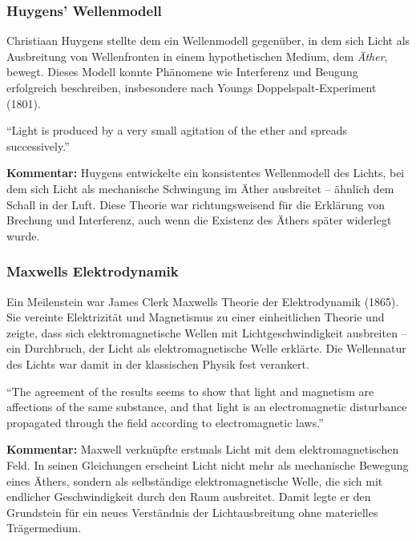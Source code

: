 \subsubsection{Huygens’ Wellenmodell}
Christiaan Huygens stellte dem ein Wellenmodell gegenüber, in dem sich Licht als Ausbreitung von Wellenfronten in einem hypothetischen Medium, dem \emph{Äther}, bewegt. Dieses Modell konnte Phänomene wie Interferenz und Beugung erfolgreich beschreiben, insbesondere nach Youngs Doppelspalt-Experiment (1801).
\vspace{1em}
\begin{tcolorbox}[physikbox, title={Huygens (1960) über Lichtausbreitung \cite{huygens_light}}]
	\label{box:huygens}
	“Light is produced by a very small agitation of the ether and spreads successively.”\\
	
	
	\vspace{1em}
	
	\textbf{Kommentar:} Huygens entwickelte ein konsistentes Wellenmodell des Lichts, bei dem sich Licht als mechanische Schwingung im Äther ausbreitet – ähnlich dem Schall in der Luft. Diese Theorie war richtungsweisend für die Erklärung von Brechung und Interferenz, auch wenn die Existenz des Äthers später widerlegt wurde.
\end{tcolorbox}
\vspace{1em}
\newpage
\noindent
\subsubsection{Maxwells Elektrodynamik}
Ein Meilenstein war James Clerk Maxwells Theorie der Elektrodynamik (1865). Sie vereinte Elektrizität und Magnetismus zu einer einheitlichen Theorie und zeigte, dass sich elektromagnetische Wellen mit Lichtgeschwindigkeit ausbreiten – ein Durchbruch, der Licht als elektromagnetische Welle erklärte. Die Wellennatur des Lichts war damit in der klassischen Physik fest verankert.
	\vspace{1em}
\begin{tcolorbox}[physikbox,title={Maxwell (1873)über Licht und elektromagnetische Wellen \cite{maxwell_treatise}}]
	\label{box:maxwell}
	“The agreement of the results seems to show that light and magnetism are affections of the same substance, and that light is an electromagnetic disturbance propagated through the field according to electromagnetic laws.”\\
	
	
	\vspace{1em}
	
	\textbf{Kommentar:} Maxwell verknüpfte erstmals Licht mit dem elektromagnetischen Feld. In seinen Gleichungen erscheint Licht nicht mehr als mechanische Bewegung eines Äthers, sondern als selbständige elektromagnetische Welle, die sich mit endlicher Geschwindigkeit durch den Raum ausbreitet. Damit legte er den Grundstein für ein neues Verständnis der Lichtausbreitung ohne materielles Trägermedium.
\end{tcolorbox}

